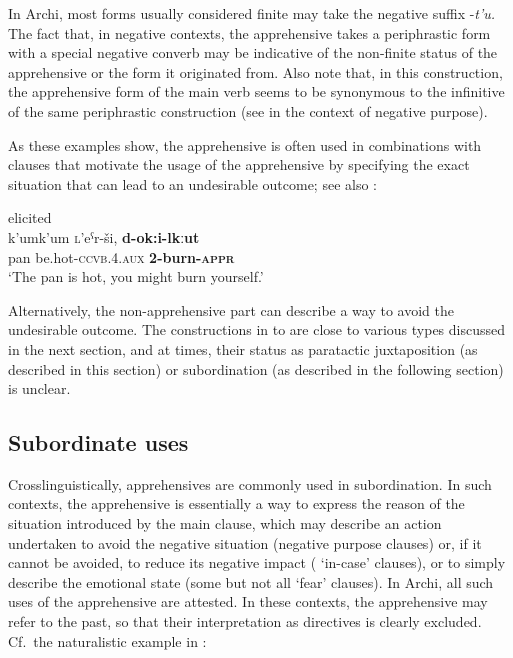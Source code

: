 \documentclass[output=paper,colorlinks,citecolor=brown]{langscibook}
\begin{document}
In Archi, most forms usually considered finite may take the negative suffix \nobreakdash-\textit{t'u.} The fact that, in negative contexts, the apprehensive takes a periphrastic form with a special negative converb may be indicative of the non-finite status of the apprehensive or the form it originated from. Also note that, in this construction, the apprehensive form of the main verb seems to be synonymous to the infinitive of the same periphrastic construction (see  in the context of negative purpose).

As these examples show, the apprehensive is often used in combinations with clauses that motivate the usage of the apprehensive by specifying the exact situation that can lead to an undesirable outcome; see also :
 
    \ea \label{ex:DD12} \textnormal{elicited} \\
\gll k'umk'um \textsc{l}'eˁr-ši, \textbf{d-ok:i-lkːut} \\
pan be.hot-\textsc{ccvb.4.aux} \textbf{2-burn-\textsc{appr}} \\
\glt `The pan is hot, you might burn yourself.'
\z


 Alternatively, the non-apprehensive part can describe a way to avoid the undesirable outcome. The constructions in  to  are close to various types discussed in the next section, and at times, their status as paratactic juxtaposition (as described in this section) or subordination (as described in the following section) is unclear.
 

\subsection{Subordinate uses}
\label{subsec:Asubordinate}
 
Crosslinguistically, apprehensives are commonly used in subordination. In such contexts, the apprehensive is essentially a way to express the reason of the situation introduced by the main clause, which may describe an action undertaken to avoid the negative situation (negative purpose clauses) or, if it cannot be avoided, to reduce its negative impact ( `in-case' clauses), or to simply describe the emotional state (some but not all `fear' clauses). In Archi, all such uses of the apprehensive are attested. In these contexts, the apprehensive may refer to the past, so that their interpretation as directives is clearly excluded. Cf.\ the naturalistic example in :
\end{document}
